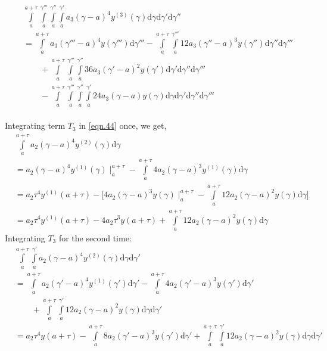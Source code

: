 \documentclass{article}
\begin{document}
\begin{equation}
\begin{split}
	&\int\limits_{a}^{a+\tau}\int\limits_{a}^{\gamma'''}\int\limits_{a}^{\gamma''}\int\limits_{a}^{\gamma'}a_3(\gamma -a)^{4}y^{(3)}(\gamma)\mathrm{d}\gamma\mathrm{d}\gamma'\mathrm{d}\gamma''\\
	& = \int\limits_{a}^{a+\tau}a_3(\gamma'''-a)^{4}y(\gamma''')\mathrm{d}\gamma''' - \int\limits_{a}^{a+\tau}\int\limits_{a}^{\gamma'''}12a_3(\gamma'' -a)^{3}y(\gamma'')\mathrm{d}\gamma''\mathrm{d}\gamma'''\\ 	&\qquad{}+\int\limits_{a}^{a+\tau}\int\limits_{a}^{\gamma'''}\int\limits_{a}^{\gamma''}36a_3(\gamma'-a)^{2}y(\gamma')\mathrm{d}\gamma'\mathrm{d}\gamma''\mathrm{d}\gamma''' \\&\qquad{}-\int\limits_{a}^{a+\tau}\int\limits_{a}^{\gamma'''}\int\limits_{a}^{\gamma''}\int\limits_{a}^{\gamma'}24a_3(\gamma-a)y(\gamma)\mathrm{d}\gamma\mathrm{d}\gamma'\mathrm{d}\gamma''\mathrm{d}\gamma'''
\end{split}
\end{equation}
\\Integrating term $T_3$ in \eqref{eqn.44} once, we get,
\begin{equation}
\begin{split}
	&\int\limits_{a}^{a+\tau}a_2(\gamma-a)^{4}y^{(2)}(\gamma)\mathrm{d}\gamma\\
	&=a_2(\gamma-a)^{4}y^{(1)}(\gamma)\mid_{a}^{a+\tau} - \int\limits_{a}^{a+\tau}4a_2(\gamma-a)^{3}y^{(1)}(\gamma)\mathrm{d}\gamma\\
	&=a_2\tau^4y^{(1)}(a+\tau) - \bigg[4a_2(\gamma-a)^3y(\gamma)\mid_{a}^{a+\tau} - \int\limits_{a}^{a+\tau}12a_2(\gamma-a)^2y(\gamma)\mathrm{d}\gamma\bigg]\\
	&=a_2\tau^4y^{(1)}(a+\tau) -4a_2\tau^3y(a+\tau)+\int\limits_{a}^{a+\tau}12a_2(\gamma-a)^2y(\gamma)\mathrm{d}\gamma
\end{split}
\end{equation}
Integrating $T_3$ for the second time:
\begin{equation}
\begin{split}
	&\int\limits_{a}^{a+\tau}\int\limits_{a}^{\gamma'}a_2(\gamma-a)^{4}y^{(2)}(\gamma)\mathrm{d}\gamma\mathrm{d}\gamma'\\
	&=\int\limits_{a}^{a+\tau}a_2(\gamma'-a)^4y^{(1)}(\gamma')\mathrm{d}\gamma' -\int\limits_{a}^{a+\tau}4a_2(\gamma'-a)^3y(\gamma')\mathrm{d}\gamma'
	\\&\qquad{}+\int\limits_{a}^{a+\tau}\int\limits_{a}^{\gamma'}12a_2(\gamma-a)^2y(\gamma)\mathrm{d}\gamma\mathrm{d}\gamma'\\
	&=a_2\tau^{4}y(a+\tau)-\int\limits_{a}^{a+\tau}8a_2(\gamma'-a)^{3}y(\gamma')\mathrm{d}\gamma' + \int\limits_{a}^{a+\tau}\int\limits_{a}^{\gamma'}12a_2(\gamma-a)^2y(\gamma)\mathrm{d}\gamma\mathrm{d}\gamma'
\end{split}
\end{equation}
\end{document}
